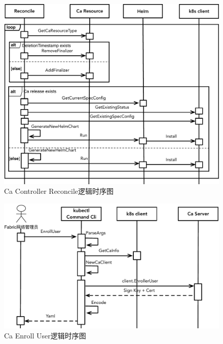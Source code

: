 \begin{figure}[!htbp] %
    \centering %
    \includegraphics[width=1.0\textwidth]{FIGs/chapter4/reconcile.pdf} %
    \caption{Ca Controller Reconcile逻辑时序图} %
    \label{reconcile} %
\end{figure}%

\begin{figure}[!htbp] %
    \centering %
    \includegraphics[width=1.0\textwidth]{FIGs/chapter4/enroll.pdf} %
    \caption{Ca Enroll User逻辑时序图} %
    \label{enroll} %
\end{figure}%

